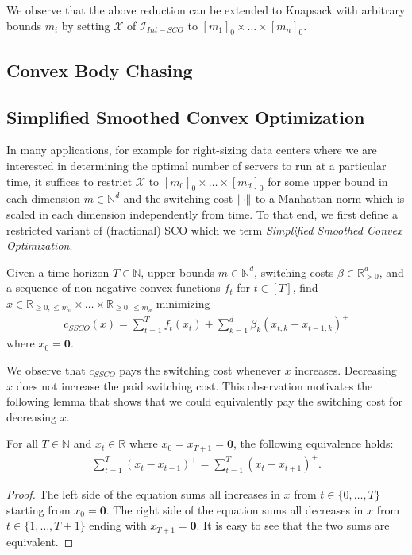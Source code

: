 We observe that the above reduction can be extended to Knapsack with arbitrary bounds $m_i$ by setting $\mathcal{X}$ of $\mathcal{I}_{Int-SCO}$ to $[m_1]_0 \times \dots \times [m_n]_0$.

\subsection{Convex Body Chasing}

\subsection{Simplified Smoothed Convex Optimization}\label{section:theory:simplified_smoothed_convex_optimization}

In many applications, for example for right-sizing data centers where we are interested in determining the optimal number of servers to run at a particular time, it suffices to restrict $\mathcal{X}$ to $[m_0]_0 \times \dots \times [m_d]_0$ for some upper bound in each dimension $m \in \mathbb{N}^d$ and the switching cost $\lVert\cdot\rVert$ to a Manhattan norm which is scaled in each dimension independently from time. To that end, we first define a restricted variant of (fractional) SCO which we term \textit{Simplified Smoothed Convex Optimization}.

\begin{problem}\label{problem:simplified_smoothed_convex_optimization}
Given a time horizon $T \in \mathbb{N}$, upper bounds $m \in \mathbb{N}^d$, switching costs $\beta \in \mathbb{R}_{>0}^d$, and a sequence of non-negative convex functions $f_t$ for $t \in [T]$, find $x \in \mathbb{R}_{\geq 0, \leq m_0} \times \dots \times \mathbb{R}_{\geq 0, \leq m_d}$ minimizing \begin{align*}
    c_{SSCO}(x) = \sum_{t=1}^T f_t(x_t) + \sum_{k=1}^d \beta_k (x_{t,k} - x_{t-1,k})^+
\end{align*}
where $x_0 = \mathbf{0}$.
\end{problem}

We observe that $c_{SSCO}$ pays the switching cost whenever $x$ increases. Decreasing $x$ does not increase the paid switching cost. This observation motivates the following lemma that shows that we could equivalently pay the switching cost for decreasing $x$.

\begin{lemma}
\label{lemma:inverse_switching_cost}
For all $T \in \mathbb{N}$ and $ x_t \in \mathbb{R}$ where $x_0 = x_{T+1} = \mathbf{0}$, the following equivalence holds:
\begin{align*}
    \sum_{t=1}^T (x_t - x_{t-1})^+ = \sum_{t=1}^T (x_t - x_{t+1})^+.
\end{align*}
\end{lemma}
\begin{proof}
The left side of the equation sums all increases in $x$ from $t \in \{0, \dots, T\}$ starting from $x_0 = \mathbf{0}$. The right side of the equation sums all decreases in $x$ from $t \in \{1, \dots, T+1\}$ ending with $x_{T+1} = \mathbf{0}$. It is easy to see that the two sums are equivalent.
\end{proof}

